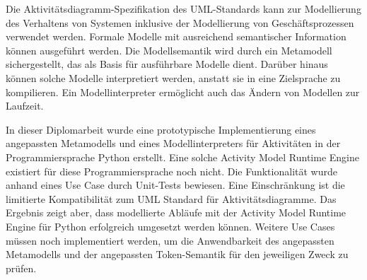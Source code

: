 Die Aktivitätsdiagramm-Spezifikation des UML-Standards kann zur Modellierung des Verhaltens von Systemen inklusive der Modellierung von Geschäfts\-prozessen verwendet werden. Formale Modelle mit ausreichend semantischer Information können ausgeführt werden. Die Modellsemantik wird durch ein Metamodell sichergestellt, das als Basis für ausführbare Modelle dient. Darüber hinaus können solche Modelle interpretiert werden, anstatt sie in eine Zielsprache zu kompilieren. Ein Modellinterpreter ermöglicht auch das Ändern von Modellen zur Laufzeit.

In dieser Diplomarbeit wurde eine prototypische Implementierung eines angepassten Metamodells und eines Modellinterpreters für Aktivitäten in der Programmiersprache Python erstellt. Eine solche Activity Model Runtime Engine existiert für diese Programmiersprache noch nicht. Die Funktionalität wurde anhand eines Use Case durch Unit-Tests bewiesen. Eine Einschränkung ist die limitierte Kompatibilität zum UML Standard für Aktivitätsdiagramme. Das Ergebnis zeigt aber, dass  modellierte Abläufe mit der Activity Model Runtime Engine für Python erfolgreich umgesetzt werden können. Weitere Use Cases müssen noch implementiert werden, um die Anwendbarkeit des angepassten Metamodells und der angepassten Token-Semantik für den jeweiligen Zweck zu prüfen.




